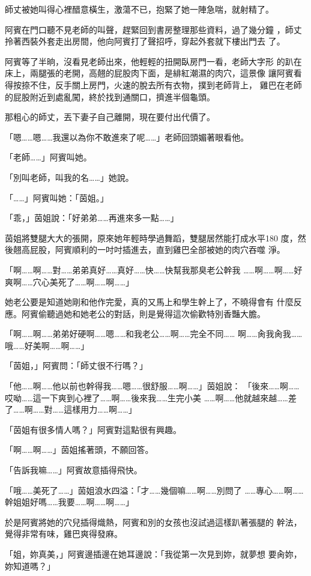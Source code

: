 師丈被她叫得心裡醋意橫生，激蕩不已，抱緊了她一陣急喘，就射精了。

阿賓在門口聽不見老師的叫聲，趕緊回到書房整理那些資料，過了幾分鐘
，師丈拎著西裝外套走出房間，他向阿賓打了聲招呼，穿起外套就下樓出門去
了。

阿賓等了半晌，沒看見老師出來，他輕輕的扭開臥房門一看，老師大字形
的趴在床上，兩腿張的老開，高翹的屁股肉下面，是緋紅潮濕的肉穴，這景像
讓阿賓看得按捺不住，反手關上房門，火速的脫去所有衣物，撲到老師背上，
雞巴在老師的屁股附近到處亂闖，終於找到通關口，擠進半個龜頭。

那粗心的師丈，丟下妻子自己離開，現在要付出代價了。

「嗯……嗯……我還以為你不敢進來了呢……」老師回頭媚著眼看他。

「老師……」阿賓叫她。

「別叫老師，叫我的名……」她說。

「……」阿賓叫她：「茵姐。」

「乖，」茵姐說：「好弟弟……再進來多一點……」

茵姐將雙腿大大的張開，原來她年輕時學過舞蹈，雙腿居然能打成水平180
度，然後翹高屁股，阿賓順利的一吋吋插進去，直到雞巴全部被她的肉穴吞噬
淨。

「啊……啊……對……弟弟真好……真好……快……快幫我那臭老公幹我
……啊……啊……好爽啊……穴心美死了……啊……啊……」

她老公要是知道她剛和他作完愛，真的又馬上和學生幹上了，不曉得會有
什麼反應。阿賓偷聽過她和她老公的對話，則是覺得這次偷歡特別香豔大膽。

「啊……啊……弟弟好硬啊……嗯……和我老公……啊……完全不同……
啊……肏我肏我……哦……好美啊……啊……」

「茵姐，」阿賓問：「師丈很不行嗎？」

「他……啊……他以前也幹得我……嗯……很舒服……啊……」茵姐說：
「後來……啊……哎呦……這一下爽到心裡了……啊……後來我……生完小美
……啊……他就越來越……差了……啊……對……這樣用力……啊……」

「茵姐有很多情人嗎？」阿賓對這點很有興趣。

「啊……啊……」茵姐搖著頭，不願回答。

「告訴我嘛……」阿賓故意插得飛快。

「哦……美死了……」茵姐浪水四溢：「才……幾個嘛……啊……別問了
……專心……啊……幹姐姐好嗎……我要……啊……啊……」

於是阿賓將她的穴兒插得熾熱，阿賓和別的女孩也沒試過這樣趴著張腿的
幹法，覺得非常有味，雞巴爽得發麻。

「姐，妳真美，」阿賓邊插邊在她耳邊說：「我從第一次見到妳，就夢想
要肏妳，妳知道嗎？」


